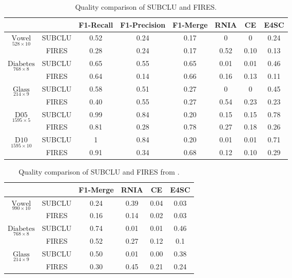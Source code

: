 \begin{table}[H]
\centering
\begin{tabular}{|c|c|c|c|c|c|c|c|}
	\hline
	&&\small F1-Recall&\small F1-Precision&\small F1-Merge&\small RNIA&\small CE&\small E4SC\\
	\hline
	\hline
	\multirow{2}{3.8em}{$\underset{528\times10}{\textrm{Vowel}}$}&\small SUBCLU&0.52&0.24&0.17&0&0&0.24\\
	&\small FIRES&0.28&0.24&0.17&0.52&0.10&0.13\\
	\hline
	\hline
	\multirow{2}{3.8em}{$\underset{768\times8}{\textrm{Diabetes}}$}&\small SUBCLU&0.65&0.55&0.65&0.01&0.01&0.46\\
	&\small FIRES&0.64&0.14&0.66&0.16&0.13&0.11\\
	\hline
	\hline
	\multirow{2}{3.8em}{$\underset{214\times9}{\textrm{Glass}}$}&\small SUBCLU&0.58&0.51&0.27&0&0&0.45\\
	&\small FIRES&0.40&0.55&0.27&0.54&0.23&0.23\\
	\hline
	\hline
	\multirow{2}{3.8em}{$\underset{1595\times5}{\textrm{D05}}$}&\small SUBCLU&0.99&0.84&0.20&0.15&0.15&0.78\\
	&\small FIRES&0.81&0.28&0.78&0.27&0.18&0.26\\
	\hline
	\hline
	\multirow{2}{3.8em}{$\underset{1595\times10}{\textrm{D10}}$}&\small SUBCLU&1&0.84&0.20&0.01&0.01&0.71\\
	&\small FIRES&0.91&0.34&0.68&0.12&0.10&0.29\\
	\hline
\end{tabular}
\caption{Quality comparison of SUBCLU and FIRES.}
\label{tab:quality}
\end{table}

\begin{table}[H]
	\centering
	\begin{tabular}{|c|c|c|c|c|c|}
		\hline
		&&\small F1-Merge&\small RNIA&\small CE&\small E4SC\\
		\hline
		\hline
		\multirow{2}{3.8em}{$\underset{990\times10}{\textrm{Vowel}}$}&\small SUBCLU&0.24&0.39&0.04&0.03\\
		&\small FIRES&0.16&0.14&0.02&0.03\\
		\hline
		\hline
		\multirow{2}{3.8em}{$\underset{768\times8}{\textrm{Diabetes}}$}&\small SUBCLU&0.74&0.01&0.01&0.46\\
		&\small FIRES&0.52&0.27&0.12&0.1\\
		\hline
		\hline
		\multirow{2}{3.8em}{$\underset{214\times9}{\textrm{Glass}}$}&\small SUBCLU&0.50&0.01&0.00&0.38\\
		&\small FIRES&0.30&0.45&0.21&0.24\\
		\hline
	\end{tabular}
	\caption{Quality comparison of SUBCLU and FIRES from \citep{10.1145/2063576.2063774}.}
	\label{tab:scoresFromPaper}
\end{table}

